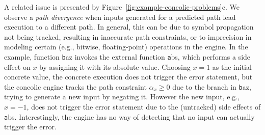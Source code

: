 	A related issue is presented by Figure~\ref{fig:example-concolic-problems}c. We observe a {\em path divergence} when inputs generated for a predicted path lead execution to a different path. In general, this can be due to symbol propagation not being tracked, resulting in inaccurate path constraints, or to imprecision in modeling certain (e.g., bitwise, floating-point) operations in the engine. In the example, function {\texttt baz} invokes the external function {\texttt abs}, which performs a side effect on $x$ by assigning it with its absolute value. Choosing $x = 1$ as the initial concrete value, the concrete execution does not trigger the error statement, but the concolic engine tracks the path constraint $\alpha_x \geq 0$ due to the branch in {\texttt baz}, trying to generate a new input by negating it. However the new input, e.g., $x = -1$, does not trigger the error statement due to the (untracked) side effects of {\texttt abs}. Interestingly, the engine has no way of detecting that no input can actually trigger the error.

